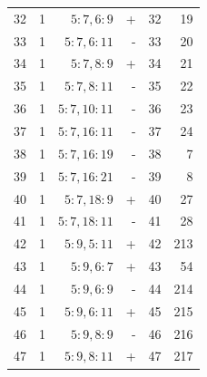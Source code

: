 \begin{center}
\begin{tabular}{rrrrrr}
32 & 1 & $5:7,6:9$ & + & 32 & 19\\
33 & 1 & $5:7,6:11$ & - & 33 & 20\\
34 & 1 & $5:7,8:9$ & + & 34 & 21\\
35 & 1 & $5:7,8:11$ & - & 35 & 22\\
36 & 1 & $5:7,10:11$ & - & 36 & 23\\
37 & 1 & $5:7,16:11$ & - & 37 & 24\\
38 & 1 & $5:7,16:19$ & - & 38 & 7\\
39 & 1 & $5:7,16:21$ & - & 39 & 8\\
40 & 1 & $5:7,18:9$ & + & 40 & 27\\
41 & 1 & $5:7,18:11$ & - & 41 & 28\\
42 & 1 & $5:9,5:11$ & + & 42 & 213\\
43 & 1 & $5:9,6:7$ & + & 43 & 54\\
44 & 1 & $5:9,6:9$ & - & 44 & 214\\
45 & 1 & $5:9,6:11$ & + & 45 & 215\\
46 & 1 & $5:9,8:9$ & - & 46 & 216\\
47 & 1 & $5:9,8:11$ & + & 47 & 217\\
\bottomrule\end{tabular}\end{center}\clearpage
